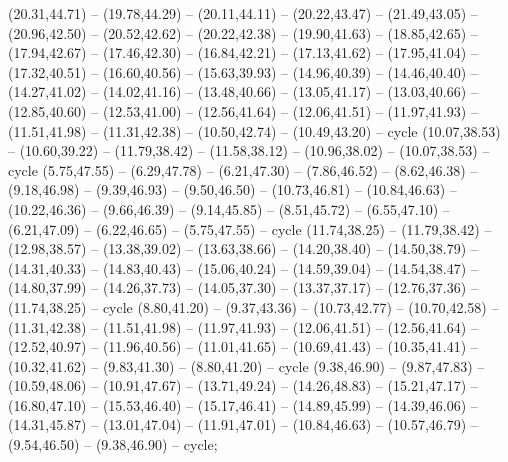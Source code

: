 {(20.31,44.71) -- (19.78,44.29) -- (20.11,44.11) -- (20.22,43.47) -- (21.49,43.05) -- (20.96,42.50) -- (20.52,42.62) -- (20.22,42.38) -- (19.90,41.63) -- (18.85,42.65) -- (17.94,42.67) -- (17.46,42.30) -- (16.84,42.21) -- (17.13,41.62) -- (17.95,41.04) -- (17.32,40.51) -- (16.60,40.56) -- (15.63,39.93) -- (14.96,40.39) -- (14.46,40.40) -- (14.27,41.02) -- (14.02,41.16) -- (13.48,40.66) -- (13.05,41.17) -- (13.03,40.66) -- (12.85,40.60) -- (12.53,41.00) -- (12.56,41.64) -- (12.06,41.51) -- (11.97,41.93) -- (11.51,41.98) -- (11.31,42.38) -- (10.50,42.74) -- (10.49,43.20) -- cycle (10.07,38.53) -- (10.60,39.22) -- (11.79,38.42) -- (11.58,38.12) -- (10.96,38.02) -- (10.07,38.53) -- cycle (5.75,47.55) -- (6.29,47.78) -- (6.21,47.30) -- (7.86,46.52) -- (8.62,46.38) -- (9.18,46.98) -- (9.39,46.93) -- (9.50,46.50) -- (10.73,46.81) -- (10.84,46.63) -- (10.22,46.36) -- (9.66,46.39) -- (9.14,45.85) -- (8.51,45.72) -- (6.55,47.10) -- (6.21,47.09) -- (6.22,46.65) -- (5.75,47.55) -- cycle (11.74,38.25) -- (11.79,38.42) -- (12.98,38.57) -- (13.38,39.02) -- (13.63,38.66) -- (14.20,38.40) -- (14.50,38.79) -- (14.31,40.33) -- (14.83,40.43) -- (15.06,40.24) -- (14.59,39.04) -- (14.54,38.47) -- (14.80,37.99) -- (14.26,37.73) -- (14.05,37.30) -- (13.37,37.17) -- (12.76,37.36) -- (11.74,38.25) -- cycle (8.80,41.20) -- (9.37,43.36) -- (10.73,42.77) -- (10.70,42.58) -- (11.31,42.38) -- (11.51,41.98) -- (11.97,41.93) -- (12.06,41.51) -- (12.56,41.64) -- (12.52,40.97) -- (11.96,40.56) -- (11.01,41.65) -- (10.69,41.43) -- (10.35,41.41) -- (10.32,41.62) -- (9.83,41.30) -- (8.80,41.20) -- cycle (9.38,46.90) -- (9.87,47.83) -- (10.59,48.06) -- (10.91,47.67) -- (13.71,49.24) -- (14.26,48.83) -- (15.21,47.17) -- (16.80,47.10) -- (15.53,46.40) -- (15.17,46.41) -- (14.89,45.99) -- (14.39,46.06) -- (14.31,45.87) -- (13.01,47.04) -- (11.91,47.01) -- (10.84,46.63) -- (10.57,46.79) -- (9.54,46.50) -- (9.38,46.90) -- cycle;
}
